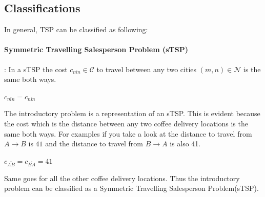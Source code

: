 \documentclass[a4paper]{article}
\begin{document}
\subsection{Classifications}
In general, TSP can be classified as following:
\paragraph*{Symmetric Travelling Salesperson Problem (sTSP)}: In a sTSP the cost $c_{\overline{mn}} \in \mathcal{C}$ to travel between any two cities $(m,n) \in \mathcal{N}$ is the same both ways.
\begin{center}
    $c_{\overline{mn}}=c_{\overline{nm}}$
\end{center}
The introductory problem is a representation of an sTSP. This is evident because the cost which is the distance between any two coffee delivery locations is the same both ways. For examples if you take a look at the distance to travel from $A\rightarrow B$ is $41$ and the distance to travel from $B \rightarrow A$ is also 41.
\begin{center}
    $c_{\overline{AB}} = c_{\overline{BA}} = 41$
\end{center}
Same goes for all the other coffee delivery locations. Thus the introductory problem can be classified as a Symmetric  Travelling  Salesperson  Problem(sTSP).
\end{document}
